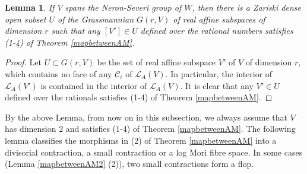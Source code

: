 \documentclass[11pt]{amsart}
\newtheorem{lem}[defn]{Lemma}
\begin{document}
\begin{lem}\label{subspace}
  \cite[Corollary 3.4]{haconSarkisovProgram2012} If $V$ spans the Neron-Severi group of $W$, then there is a Zariski dense open subset $U$ of the Grassmannian $G(r, V)$ of real affine subspaces of dimension $r$ such that any  $[V']\in U$ defined over the rational numbers satisfies (1-4) of Theorem \ref{mapbetweenAM}.
\end{lem}

\begin{proof}
  Let $U \subset G(r, V) $ be the set of real affine subspace  $V'$ of $V$ of dimension $r$, which contains no face of any $\mathcal{C}_{i}$ of $\mathcal{L}_A(V)$. In particular, the interior of  $\mathcal{L}_{A}(V')$ is contained in the interior of $\mathcal{L}_{A}(V)$. It is clear that any $V'\in U$ defined over the rationals satisfies (1-4) of Theorem \ref{mapbetweenAM}.
\end{proof}

By the above Lemma, from now on in this subsection, we always assume that $V$ has dimension $2$ and satisfies (1-4) of Theorem \ref{mapbetweenAM}. The following lemma classifies the morphisms in (2) of Theorem \ref{mapbetweenAM} into a divisorial contraction, a small contraction or a log Mori fibre space. In some cases (Lemma \ref{mapbetweenAM2} (2)), two small contractions form a flop.
\end{document}
